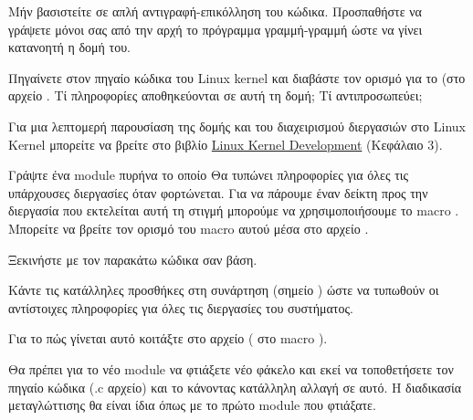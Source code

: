 \documentclass[18pt]{extarticle}
\begin{document}
\begin{info}[Σημείωση:]
Μήν βασιστείτε σε απλή αντιγραφή-επικόλληση του κώδικα.                                                                        
Προσπαθήστε να γράψετε μόνοι σας από την αρχή το πρόγραμμα γραμμή-γραμμή ώστε να γίνει κατανοητή η δομή του.                                 
\end{info}

\begin{question}
    Πηγαίνετε στον πηγαίο κώδικα του Linux kernel και διαβάστε τον ορισμό για το  (στο αρχείο .
Τί πληροφορίες αποθηκεύονται σε αυτή τη δομή; Τί αντιπροσωπεύει;

\begin{info}[Σημείωση:]
    Για μια λεπτομερή παρουσίαση της δομής  και του διαχειρισμού διεργασιών 
    στο Linux Kernel μπορείτε να βρείτε στο βιβλίο \href{https://www.doc-developpement-durable.org/file/Projets-informatiques/cours-&-manuels-informatiques/Linux/Linux\%20Kernel\%20Development,\%203rd\%20Edition.pdf}{Linux Kernel Development}
    (Κεφάλαιο 3).
\end{info}
\end{question}

\begin{question}
Γράψτε ένα module πυρήνα το οποίο Θα τυπώνει πληροφορίες για όλες τις υπάρχουσες διεργασίες όταν φορτώνεται.
Για να πάρουμε έναν δείκτη προς την διεργασία που εκτελείται αυτή τη στιγμή μπορούμε να χρησιμοποιήσουμε
το macro . Μπορείτε να βρείτε τον ορισμό του macro αυτού μέσα στο αρχείο .

Ξεκινήστε με τον παρακάτω κώδικα σαν βάση.

Κάντε τις κατάλληλες προσθήκες στη συνάρτηση  (σημείο ) ώστε να τυπωθούν οι αντίστοιχες πληροφορίες για όλες τις διεργασίες του συστήματος. 

Για το πώς γίνεται αυτό κοιτάξτε στο αρχείο ( στο macro ).

\begin{file}
    \footnotesize 
\end{file}

\begin{info}[Σημείωση]
Θα πρέπει για το νέο module να φτιάξετε νέο φάκελο και εκεί
να τοποθετήσετε τον πηγαίο κώδικα (.c αρχείο) και το  κάνοντας κατάλληλη αλλαγή σε αυτό. 
Η διαδικασία μεταγλώττισης θα είναι ίδια όπως με το πρώτο module που φτιάξατε.
\end{info}

\end{question}
\end{document}
